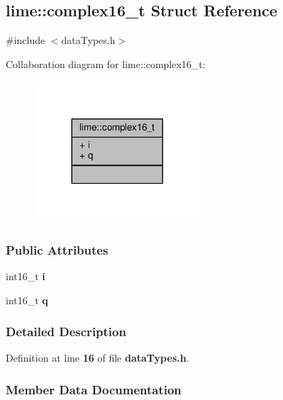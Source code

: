 \subsection{lime\+:\+:complex16\+\_\+t Struct Reference}
\label{structlime_1_1complex16__t}


{\ttfamily \#include $<$data\+Types.\+h$>$}



Collaboration diagram for lime\+:\+:complex16\+\_\+t\+:
\nopagebreak
\begin{figure}[H]
\begin{center}
\leavevmode
\includegraphics[width=176pt]{d0/d9e/structlime_1_1complex16__t__coll__graph}
\end{center}
\end{figure}
\subsubsection*{Public Attributes}
\begin{DoxyCompactItemize}
\item 
int16\+\_\+t {\bf i}
\item 
int16\+\_\+t {\bf q}
\end{DoxyCompactItemize}


\subsubsection{Detailed Description}


Definition at line {\bf 16} of file {\bf data\+Types.\+h}.



\subsubsection{Member Data Documentation}
